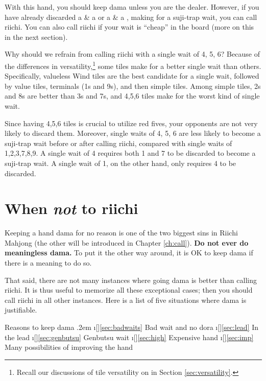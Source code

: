 \noindent With this hand, you should keep {\jap dama} unless you are the dealer. However, if you have already discarded a {\large{}} \& a {\large{}} or a {\large{}} \& a {\large{}}, making for a {\jap suji}-trap wait, you can call {\jap riichi}. You can also call {\jap riichi} if your wait is ``cheap'' in the board (more on this in the next section).

\bigskip
Why should we refrain from calling {\jap riichi} with a single wait of 4, 5, 6?
Because of the differences in versatility,\footnote{Recall our discussions of tile versatility on in Section \ref{sec:versatility}.} some tiles make for a better single wait than others. 
Specifically, valueless Wind tiles are the best candidate for a single wait, followed by value tiles, terminals (1s and 9s), and then simple tiles. Among simple tiles, 2s and 8s are better than 3s and 7s, and 4,5,6 tiles make for the worst kind of single wait. 

\bigskip
Since having 4,5,6 tiles is crucial to utilize red fives, your opponents are not very likely to discard them. Moreover, single waits of 4, 5, 6 are less likely to become a {\jap suji}-trap wait before or after calling {\jap riichi}, compared with single waits of 1,2,3,7,8,9. 
A single wait of 4 requires both 1 and 7 to be discarded to become a {\jap suji}-trap wait. A single wait of 1, on the other hand, only requires 4 to be discarded. 

\newpage
\section{When \emph{not} to {\jap riichi}} \label{sec:dama} 
Keeping a hand {\jap dama} for no reason is one of the two biggest sins in Riichi Mahjong (the other will be introduced in Chapter \ref{ch:call}). {\bf Do not ever do meaningless {\jap dama}.} To put it the other way around, it is OK to keep {\jap dama} if there is a meaning to do so. 

\bigskip
That said, there are not many instances where going {\jap dama} is better than calling {\jap riichi}. It is thus useful to memorize all these exceptional cases; then you should call {\jap riichi} in all other instances. Here is a list of five situations where {\jap dama} is justifiable. 

\bigskip
\begin{itembox}[c]{Reasons to keep {\jap dama}}
\be \itemsep.2em
\i[]\ref{sec:badwaits} Bad wait and no {\jap dora}
\i[]\ref{sec:lead} In the lead
\i[]\ref{sec:genbutsu} {\jap Genbutsu} wait
\i[]\ref{sec:high} Expensive hand
\i[]\ref{sec:imp} Many possibilities of improving the hand
\ee
\end{itembox}

